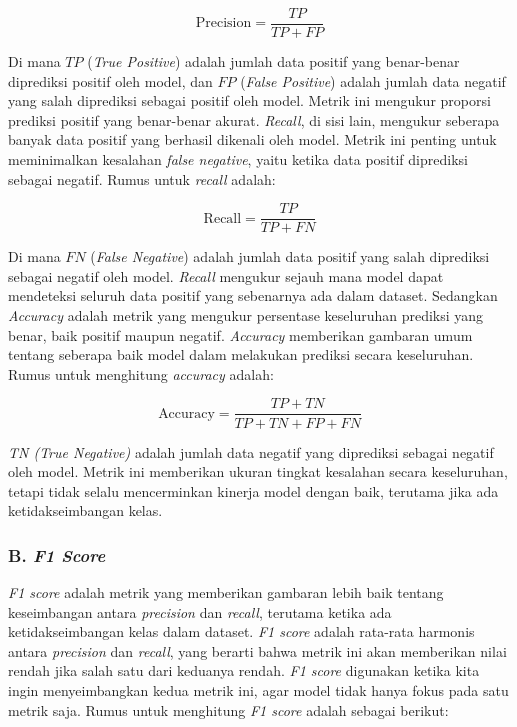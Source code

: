 \begin{equation}
  \text{Precision} = \frac{TP}{TP + FP}
\end{equation}

Di mana \( TP \) (\emph{True Positive}) adalah jumlah data positif yang benar-benar diprediksi positif oleh model, dan \( FP \) (\emph{False Positive}) adalah jumlah data negatif yang salah diprediksi sebagai positif oleh model. Metrik ini mengukur proporsi prediksi positif yang benar-benar akurat. \emph{Recall}, di sisi lain, mengukur seberapa banyak data positif yang berhasil dikenali oleh model. Metrik ini penting untuk meminimalkan kesalahan \emph{false negative}, yaitu ketika data positif diprediksi sebagai negatif. Rumus untuk \emph{recall} adalah:

\begin{equation}
  \text{Recall} = \frac{TP}{TP + FN}
\end{equation}

Di mana \( FN \) (\emph{False Negative}) adalah jumlah data positif yang salah diprediksi sebagai negatif oleh model. \emph{Recall} mengukur sejauh mana model dapat mendeteksi seluruh data positif yang sebenarnya ada dalam dataset. Sedangkan \emph{Accuracy} adalah metrik yang mengukur persentase keseluruhan prediksi yang benar, baik positif maupun negatif. \emph{Accuracy} memberikan gambaran umum tentang seberapa baik model dalam melakukan prediksi secara keseluruhan. Rumus untuk menghitung \emph{accuracy} adalah:

\begin{equation}
  \text{Accuracy} = \frac{TP + TN}{TP + TN + FP + FN}
\end{equation}

\emph{ TN  (True Negative)} adalah jumlah data negatif yang diprediksi sebagai negatif oleh model. Metrik ini memberikan ukuran tingkat kesalahan secara keseluruhan, tetapi tidak selalu mencerminkan kinerja model dengan baik, terutama jika ada ketidakseimbangan kelas\cite{V7Labs2025}.

\subsubsection{B. \emph{F1 Score}}

\emph{F1 score} adalah metrik yang memberikan gambaran lebih baik tentang keseimbangan antara \emph{precision} dan \emph{recall}, terutama ketika ada ketidakseimbangan kelas dalam dataset. \emph{F1 score} adalah rata-rata harmonis antara \emph{precision} dan \emph{recall}, yang berarti bahwa metrik ini akan memberikan nilai rendah jika salah satu dari keduanya rendah. \emph{F1 score} digunakan ketika kita ingin menyeimbangkan kedua metrik ini, agar model tidak hanya fokus pada satu metrik saja. Rumus untuk menghitung \emph{F1 score} adalah sebagai berikut:

